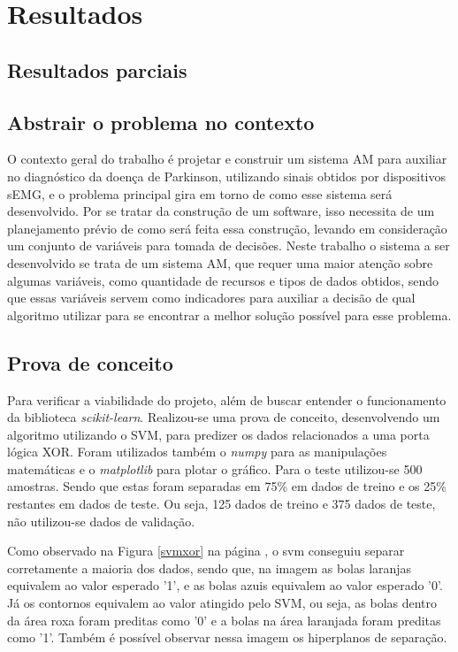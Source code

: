 \chapter{Resultados}
\label{ch:Resultados}
\section{Resultados parciais}
\section{Abstrair o problema no contexto}
O contexto geral do trabalho é projetar e construir um sistema AM para auxiliar no diagnóstico da doença de Parkinson, utilizando sinais obtidos por dispositivos sEMG, e o problema principal gira em torno de como esse sistema será desenvolvido. Por se tratar da construção de um software, isso necessita de um planejamento prévio de como será feita essa construção, levando em consideração um conjunto de variáveis para tomada de decisões. Neste trabalho o sistema a ser desenvolvido se trata de um sistema AM, que requer uma maior atenção sobre algumas variáveis, como quantidade de recursos e tipos de dados obtidos, sendo que essas variáveis servem como indicadores para auxiliar a decisão de qual algoritmo utilizar para se encontrar a melhor solução possível para esse problema.

\section{Prova de conceito}
Para verificar a viabilidade do projeto, além de buscar entender o funcionamento da biblioteca \textit{scikit-learn}. Realizou-se uma prova de conceito, desenvolvendo um algoritmo utilizando o SVM, para predizer os dados relacionados a uma porta lógica XOR. Foram utilizados também o \textit{numpy} para as manipulações matemáticas e o \textit{matplotlib} para plotar o gráfico. Para o teste utilizou-se 500 amostras. Sendo que estas foram separadas em 75\% em dados de treino e os 25\% restantes em dados de teste. Ou seja, 125 dados de treino e 375 dados de teste, não utilizou-se dados de validação.

Como observado na Figura \ref{svmxor} na página \pageref{svmxor}, o svm conseguiu separar corretamente a maioria dos dados, sendo que, na imagem as bolas laranjas equivalem ao valor esperado '1', e as bolas azuis equivalem ao valor esperado '0'. Já os contornos equivalem ao valor atingido pelo SVM, ou seja, as bolas dentro da área roxa foram preditas como '0' e  a bolas na área laranjada foram preditas como '1'. Também é possível observar nessa imagem os hiperplanos de separação.

